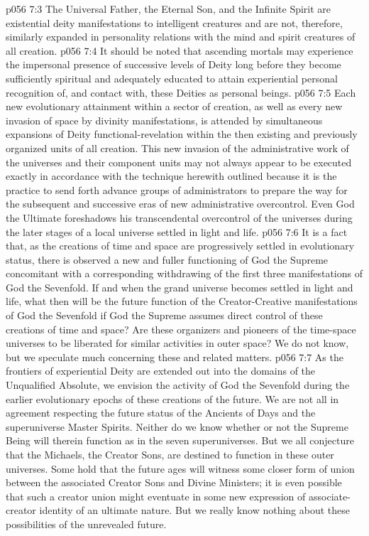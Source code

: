 \pc \vs p056 7:3 The Universal Father, the Eternal Son, and the Infinite Spirit are existential deity manifestations to intelligent creatures and are not, therefore, similarly expanded in personality relations with the mind and spirit creatures of all creation.
\pc \vs p056 7:4 It should be noted that ascending mortals may experience the impersonal presence of successive levels of Deity long before they become sufficiently spiritual and adequately educated to attain experiential personal recognition of, and contact with, these Deities as personal beings.
\vs p056 7:5 Each new evolutionary attainment within a sector of creation, as well as every new invasion of space by divinity manifestations, is attended by simultaneous expansions of Deity functional\hyp{}revelation within the then existing and previously organized units of all creation. This new invasion of the administrative work of the universes and their component units may not always appear to be executed exactly in accordance with the technique herewith outlined because it is the practice to send forth advance groups of administrators to prepare the way for the subsequent and successive eras of new administrative overcontrol. Even God the Ultimate foreshadows his transcendental overcontrol of the universes during the later stages of a local universe settled in light and life.
\vs p056 7:6 It is a fact that, as the creations of time and space are progressively settled in evolutionary status, there is observed a new and fuller functioning of God the Supreme concomitant with a corresponding withdrawing of the first three manifestations of God the Sevenfold. If and when the grand universe becomes settled in light and life, what then will be the future function of the Creator\hyp{}Creative manifestations of God the Sevenfold if God the Supreme assumes direct control of these creations of time and space? Are these organizers and pioneers of the time\hyp{}space universes to be liberated for similar activities in outer space? We do not know, but we speculate much concerning these and related matters.
\pc \vs p056 7:7 As the frontiers of experiential Deity are extended out into the domains of the Unqualified Absolute, we envision the activity of God the Sevenfold during the earlier evolutionary epochs of these creations of the future. We are not all in agreement respecting the future status of the Ancients of Days and the superuniverse Master Spirits. Neither do we know whether or not the Supreme Being will therein function as in the seven superuniverses. But we all conjecture that the Michaels, the Creator Sons, are destined to function in these outer universes. Some hold that the future ages will witness some closer form of union between the associated Creator Sons and Divine Ministers; it is even possible that such a creator union might eventuate in some new expression of associate\hyp{}creator identity of an ultimate nature. But we really know nothing about these possibilities of the unrevealed future.
